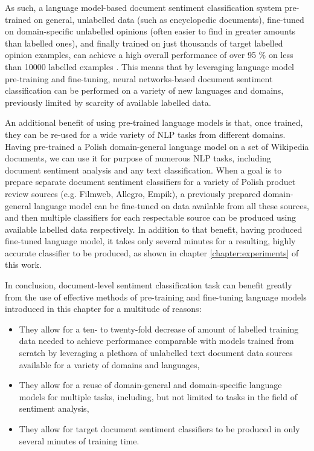 As such, a language model-based document sentiment classification system pre-trained on general, unlabelled data (such as encyclopedic documents), fine-tuned on domain-specific unlabelled opinions (often easier to find in greater amounts than labelled ones), and finally trained on just thousands of target labelled opinion examples, can achieve a high overall performance of over 95 \% on less than 10000 labelled examples \cite{raffel:limitsoftransferlearning,lan:albert,liu:roberta,liu:mtdnn}. This means that by leveraging language model pre-training and fine-tuning, neural networks-based document sentiment classification can be performed on a variety of new languages and domains, previously limited by scarcity of available labelled data.

An additional benefit of using pre-trained language models is that, once trained, they can be re-used for a wide variety of NLP tasks from different domains. Having pre-trained a Polish domain-general language model on a set of Wikipedia documents, we can use it for purpose of numerous NLP tasks, including document sentiment analysis and any text classification. When a goal is to prepare separate document sentiment classifiers for a variety of Polish product review sources (e.g. Filmweb, Allegro, Empik), a previously prepared domain-general language model can be fine-tuned on data available from all these sources, and then multiple classifiers for each respectable source can be produced using available labelled data respectively. In addition to that benefit, having produced fine-tuned language model, it takes only several minutes for a resulting, highly accurate classifier to be produced, as shown in chapter \ref{chapter:experiments} of this work.

In conclusion, document-level sentiment classification task can benefit greatly from the use of effective methods of pre-training and fine-tuning language models introduced in this chapter for a multitude of reasons:

\begin{itemize}
\item They allow for a ten- to twenty-fold decrease of amount of labelled training data needed to achieve performance comparable with models trained from scratch by leveraging a plethora of unlabelled text document data sources available for a variety of domains and languages,
\item They allow for a reuse of domain-general and domain-specific language models for multiple tasks, including, but not limited to tasks in the field of sentiment analysis,
\item They allow for target document sentiment classifiers to be produced in only several minutes of training time.
\end{itemize}

